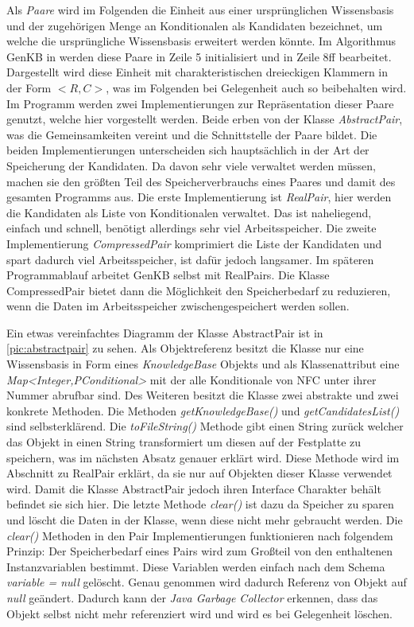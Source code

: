 \documentclass[12pt,a4paper]{article}
\begin{document}
Als \textit{Paare} wird im Folgenden die Einheit aus einer ursprünglichen Wissensbasis und der zugehörigen Menge an Konditionalen als Kandidaten bezeichnet, um welche die ursprüngliche Wissensbasis erweitert werden könnte. Im Algorithmus GenKB in \cite{beierle19} werden diese Paare in Zeile 5 initialisiert und in Zeile 8ff bearbeitet. Dargestellt wird diese Einheit mit charakteristischen dreieckigen Klammern in der Form $<R, C>$, was im Folgenden bei Gelegenheit auch so beibehalten wird. \\
Im Programm werden zwei Implementierungen zur Repräsentation dieser Paare genutzt, welche hier vorgestellt werden. Beide erben von der Klasse \textit{AbstractPair}, was die Gemeinsamkeiten vereint und die Schnittstelle der Paare bildet. Die beiden Implementierungen unterscheiden sich hauptsächlich in der Art der Speicherung der Kandidaten. Da davon sehr viele verwaltet werden müssen, machen sie den größten Teil des Speicherverbrauchs eines Paares und damit des gesamten Programms aus. Die erste Implementierung ist \textit{RealPair}, hier werden die Kandidaten als Liste von Konditionalen verwaltet. Das ist naheliegend, einfach und schnell, benötigt allerdings sehr viel Arbeitsspeicher. Die zweite Implementierung \textit{CompressedPair} komprimiert die Liste der Kandidaten und spart dadurch viel Arbeitsspeicher, ist dafür jedoch langsamer. Im späteren Programmablauf arbeitet GenKB selbst mit RealPairs. Die Klasse CompressedPair bietet dann die Möglichkeit den Speicherbedarf zu reduzieren, wenn die Daten im Arbeitsspeicher zwischengespeichert werden sollen.








Ein etwas vereinfachtes Diagramm der Klasse AbstractPair ist in \autoref{pic:abstractpair} zu sehen. Als Objektreferenz besitzt die Klasse nur eine Wissensbasis in Form eines \textit{KnowledgeBase} Objekts und als Klassenattribut eine \textit{Map<Integer,PConditional>} mit der alle Konditionale von NFC unter ihrer Nummer abrufbar sind. Des Weiteren besitzt die Klasse zwei abstrakte und zwei konkrete Methoden. Die Methoden \textit{getKnowledgeBase()} und \textit{getCandidatesList()} sind selbsterklärend. Die \textit{toFileString()} Methode gibt einen String zurück welcher das Objekt in einen String transformiert um diesen auf der Festplatte zu speichern, was im nächsten Absatz genauer erklärt wird. Diese Methode wird im Abschnitt zu RealPair erklärt, da sie nur auf Objekten dieser Klasse verwendet wird. Damit die Klasse AbstractPair jedoch ihren Interface Charakter behält befindet sie sich hier. Die letzte Methode \textit{clear()} ist dazu da Speicher zu sparen und löscht die Daten in der Klasse, wenn diese nicht mehr gebraucht werden. Die \textit{clear()} Methoden in den Pair Implementierungen funktionieren nach folgendem Prinzip: Der Speicherbedarf eines Pairs wird zum Großteil von den enthaltenen Instanzvariablen bestimmt. Diese Variablen werden einfach nach dem Schema \textit{variable = null} \glqq gelöscht\grqq . Genau genommen wird dadurch Referenz von Objekt auf \textit{null} geändert. Dadurch kann der \textit{Java Garbage Collector} erkennen, dass das Objekt selbst nicht mehr referenziert wird und wird es bei Gelegenheit löschen.
\end{document}
